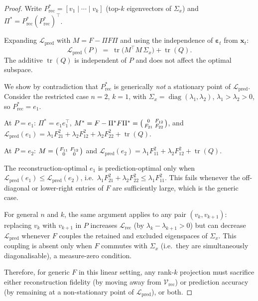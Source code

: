 \begin{proof}
Write $P_{\mathrm{rec}}^* = [v_1 \mid \cdots \mid v_k]$ (top-$k$
eigenvectors of $\Sigma_x$) and $\Pi^* = P_{\mathrm{rec}}^*
(P_{\mathrm{rec}}^*)^\top$.

Expanding $\mathcal{L}_{\mathrm{pred}}$ with
$M = F - \Pi F \Pi$ and using the independence of
$\boldsymbol{\varepsilon}_t$ from $\mathbf{x}_t$:
\begin{equation}
  \mathcal{L}_{\mathrm{pred}}(P) \;=\;
  \operatorname{tr}\!\bigl(M^\top M\,\Sigma_x\bigr) + \operatorname{tr}(Q).
  \label{eq:pred-expand}
\end{equation}
The additive $\operatorname{tr}(Q)$ is independent of $P$ and does not
affect the optimal subspace.

We show by contradiction that $P_{\mathrm{rec}}^*$ is generically
\emph{not} a stationary point of $\mathcal{L}_{\mathrm{pred}}$.
Consider the restricted case $n = 2$, $k = 1$, with
$\Sigma_x = \operatorname{diag}(\lambda_1, \lambda_2)$,
$\lambda_1 > \lambda_2 > 0$, so
$P_{\mathrm{rec}}^* = e_1$.

At $P = e_1$: $\Pi^* = e_1 e_1^\top$,
$M^* = F - \Pi^* F \Pi^* = \begin{psmallmatrix} 0 & F_{12} \\ F_{21} & F_{22} \end{psmallmatrix}$,
and $\mathcal{L}_{\mathrm{pred}}(e_1)
= \lambda_1 F_{21}^2 + \lambda_2 F_{12}^2 + \lambda_2 F_{22}^2 + \operatorname{tr}(Q)$.

At $P = e_2$: $M = \begin{psmallmatrix} F_{11} & F_{12} \\ 0 & 0 \end{psmallmatrix}$
and $\mathcal{L}_{\mathrm{pred}}(e_2)
= \lambda_1 F_{11}^2 + \lambda_2 F_{12}^2 + \operatorname{tr}(Q)$.

The reconstruction-optimal $e_1$ is prediction-optimal only when
$\mathcal{L}_{\mathrm{pred}}(e_1) \leq \mathcal{L}_{\mathrm{pred}}(e_2)$,
i.e.\ $\lambda_1 F_{21}^2 + \lambda_2 F_{22}^2 \leq \lambda_1 F_{11}^2$.
This fails whenever the off-diagonal or lower-right entries of $F$ are
sufficiently large, which is the generic case.

For general $n$ and $k$, the same argument applies to any pair
$(v_k, v_{k+1})$: replacing $v_k$ with $v_{k+1}$ in $P$ increases
$\mathcal{L}_{\mathrm{rec}}$ (by $\lambda_k - \lambda_{k+1} > 0$) but
can decrease $\mathcal{L}_{\mathrm{pred}}$ whenever $F$ couples the
retained and excluded eigenspaces of $\Sigma_x$.  This coupling is
absent only when $F$ commutes with $\Sigma_x$ (i.e.\ they are
simultaneously diagonalisable), a measure-zero condition.

Therefore, for generic $F$ in this linear setting, any rank-$k$
projection must sacrifice either reconstruction fidelity (by moving
away from $\mathcal{V}_{\mathrm{rec}}$) or prediction accuracy (by
remaining at a non-stationary point of $\mathcal{L}_{\mathrm{pred}}$),
or both.
\end{proof}

